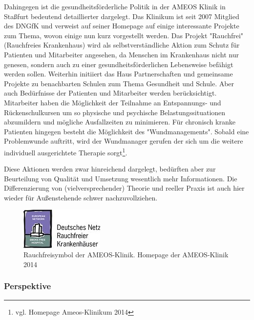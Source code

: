 Dahingegen ist die gesundheitsförderliche Politik in der AMEOS Klinik in Staßfurt bedeutend detaillierter dargelegt. Das Klinikum ist seit 2007 Mitglied des DNGfK und verweist auf seiner Homepage auf einige interessante Projekte zum Thema, wovon einige nun kurz vorgestellt werden. Das Projekt "Rauchfrei" (Rauchfreies Krankenhaus) wird als selbstverständliche Aktion zum Schutz für Patienten und Mitarbeiter angesehen, da Menschen im Krankenhaus nicht nur genesen, sondern auch zu einer gesundheitsförderlichen Lebensweise befähigt werden sollen. Weiterhin initiiert das Haus Partnerschaften und gemeinsame Projekte zu benachbarten Schulen zum Thema Gesundheit und Schule. Aber auch Bedürfnisse der Patienten und Mitarbeiter werden berücksichtigt. Mitarbeiter haben die Möglichkeit der Teilnahme an Entspannungs- und Rückenschulkursen um so physische und psychische Belastungssituationen abzumildern und mögliche Ausfallzeiten zu minimieren. Für chronisch kranke Patienten hingegen besteht die Möglichkeit des "Wundmanagements". Sobald eine Problemwunde auftritt, wird der Wundmanager gerufen der sich um die weitere individuell ausgerichtete Therapie sorgt\footnote{vgl. Homepage Ameos-Klinikum 2014}.

Diese Aktionen werden zwar hinreichend dargelegt, bedürften aber zur Beurteilung von Qualität und Umsetzung wesentlich mehr Informationen. Die Differenzierung von (vielversprechender) Theorie und reeller Praxis ist auch hier wieder für Außenstehende schwer nachzuvollziehen.

\begin{figure}[h]
	\centering
		\includegraphics[scale=2.75]{rauchfreiymbol.jpg}
	\caption{Rauchfreisymbol der AMEOS-Klinik. Homepage der AMEOS-Klinik 2014}
	\label{fig:rauchfreiymbol}
\end{figure}


\subsubsection{Perspektive}
\label{sec:Perspektive}

